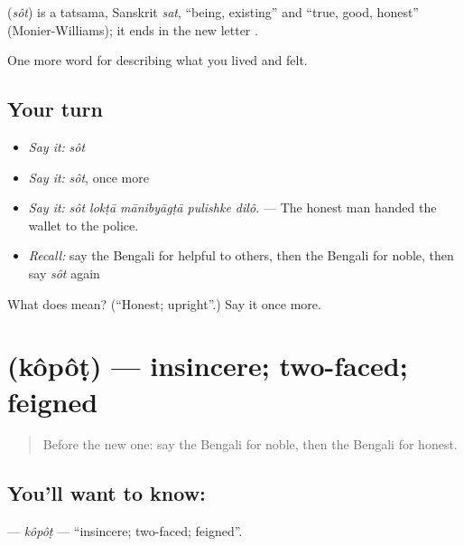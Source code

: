 \begin{cousinweb}
\textbf{} (\emph{sôt}) is a tatsama, Sanskrit \emph{sat}, \textquotedblleft{}being, existing\textquotedblright{} and \textquotedblleft{}true, good, honest\textquotedblright{} (Monier-Williams); it ends in the new letter .
\end{cousinweb}

\begin{grammarlens}[title={What you've built}]
One more word for describing what you lived and felt.
\end{grammarlens}

\subsection*{Your turn}
\begin{itemize}
\raggedright
  \item \emph{Say it:} \emph{sôt}
  \item \emph{Say it:} \emph{sôt}, once more
  \item \emph{Say it:} \emph{sôt lokṭā mānibyāgṭā pulishke dilô.} — The honest man handed the wallet to the police.
  \item \emph{Recall:} say the Bengali for helpful to others, then the Bengali for noble, then say \emph{sôt} again
\end{itemize}

\begin{tcolorbox}[breakable,colback=teal!4,colframe=teal!35!black,title={Before you move on}]
What does  mean? (\textquotedblleft{}Honest; upright\textquotedblright{}.) Say it once more.
\end{tcolorbox}
\section[\texorpdfstring{\bn{কপট} (kôpôṭ)}{কপট (kôpôṭ)}]{ (kôpôṭ) — insincere; two-faced; feigned}

\label{lesson:BN-C458-kopot}



\begin{quote}
Before the new one: say the Bengali for noble, then the Bengali for honest.
\end{quote}

\subsection*{You'll want to know: }
\textbf{} — \emph{kôpôṭ} — \textquotedblleft{}insincere; two-faced; feigned\textquotedblright{}.

